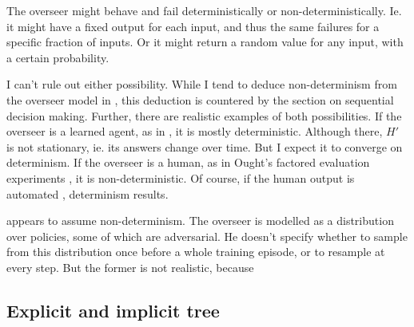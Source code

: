 \documentclass{farlamp}
\begin{document}
The overseer might behave and fail deterministically or non-deterministically.
Ie. it might have a fixed output for each input, and thus the same failures for
a specific fraction of inputs. Or it might return a random value for any input,
with a certain probability.

I can't rule out either possibility. While I tend to deduce non-determinism from
the overseer model in \textcite{ChriRelAmp}, this deduction is countered by the
section on sequential decision making. Further, there are realistic examples of
both possibilities. If the overseer is a learned agent, as in
\textcite{CSASupAmp}, it is mostly deterministic. Although there, $H'$ is not
stationary, ie. its answers change over time. But I expect it to converge on
determinism. If the overseer is a human, as in Ought's factored evaluation
experiments \parencite{StuhDelCog}, it is non-deterministic. Of course, if the
human output is automated \parencite[see][sec. ‘Caching’ f.]{StuhTaxCapAmp},
determinism results.

appears to assume
non-determinism. The overseer is modelled as a distribution over policies, some
of which are adversarial. He doesn't specify whether to sample from this
distribution once before a whole training episode, or to resample at every step.
But the former is not realistic, because

%
%
%
%


\subsection{Explicit and implicit tree}
\end{document}
